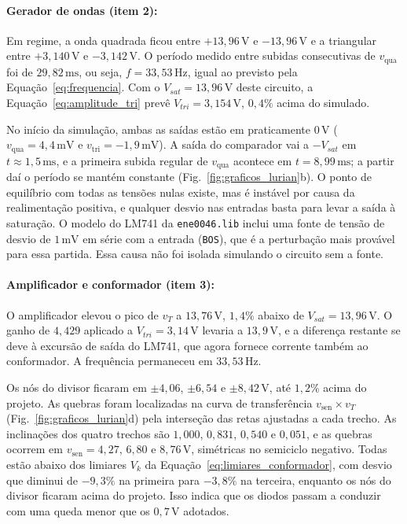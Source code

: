 \documentclass[11pt,a4paper]{article}
\begin{document}
\paragraph{Gerador de ondas (item 2):}
Em regime, a onda quadrada ficou entre $+13{,}96\,\text{V}$ e $-13{,}96\,\text{V}$ e a triangular entre $+3{,}140\,\text{V}$ e $-3{,}142\,\text{V}$. O período medido entre subidas consecutivas de $v_{\text{qua}}$ foi de $29{,}82\,\text{ms}$, ou seja, $f=33{,}53\,\text{Hz}$, igual ao previsto pela Equação~\ref{eq:frequencia}. Com o $V_{sat}=13{,}96\,\text{V}$ deste circuito, a Equação~\ref{eq:amplitude_tri} prevê $V_{tri}=3{,}154\,\text{V}$, $0{,}4\%$ acima do simulado.

No início da simulação, ambas as saídas estão em praticamente $0\,\text{V}$ ($v_{\text{qua}}=4{,}4\,\text{mV}$ e $v_{\text{tri}}=-1{,}9\,\text{mV}$). A saída do comparador vai a $-V_{sat}$ em $t\approx1{,}5\,\text{ms}$, e a primeira subida regular de $v_{\text{qua}}$ acontece em $t=8{,}99\,\text{ms}$; a partir daí o período se mantém constante (Fig.~\ref{fig:graficos_lurian}b). O ponto de equilíbrio com todas as tensões nulas existe, mas é instável por causa da realimentação positiva, e qualquer desvio nas entradas basta para levar a saída à saturação. O modelo do LM741 da \texttt{ene0046.lib} inclui uma fonte de tensão de desvio de $1\,\text{mV}$ em série com a entrada (\texttt{BOS}), que é a perturbação mais provável para essa partida. Essa causa não foi isolada simulando o circuito sem a fonte.

\paragraph{Amplificador e conformador (item 3):}
O amplificador elevou o pico de $v_T$ a $13{,}76\,\text{V}$, $1{,}4\%$ abaixo de $V_{sat}=13{,}96\,\text{V}$. O ganho de $4{,}429$ aplicado a $V_{tri}=3{,}14\,\text{V}$ levaria a $13{,}9\,\text{V}$, e a diferença restante se deve à excursão de saída do LM741, que agora fornece corrente também ao conformador. A frequência permaneceu em $33{,}53\,\text{Hz}$.

Os nós do divisor ficaram em $\pm4{,}06$, $\pm6{,}54$ e $\pm8{,}42\,\text{V}$, até $1{,}2\%$ acima do projeto. As quebras foram localizadas na curva de transferência $v_{\text{sen}}\times v_T$ (Fig.~\ref{fig:graficos_lurian}d) pela interseção das retas ajustadas a cada trecho. As inclinações dos quatro trechos são $1{,}000$, $0{,}831$, $0{,}540$ e $0{,}051$, e as quebras ocorrem em $v_{\text{sen}}=4{,}27$, $6{,}80$ e $8{,}76\,\text{V}$, simétricas no semiciclo negativo. Todas estão abaixo dos limiares $V_k$ da Equação~\ref{eq:limiares_conformador}, com desvio que diminui de $-9{,}3\%$ na primeira para $-3{,}8\%$ na terceira, enquanto os nós do divisor ficaram acima do projeto. Isso indica que os diodos passam a conduzir com uma queda menor que os $0{,}7\,\text{V}$ adotados.
\end{document}
